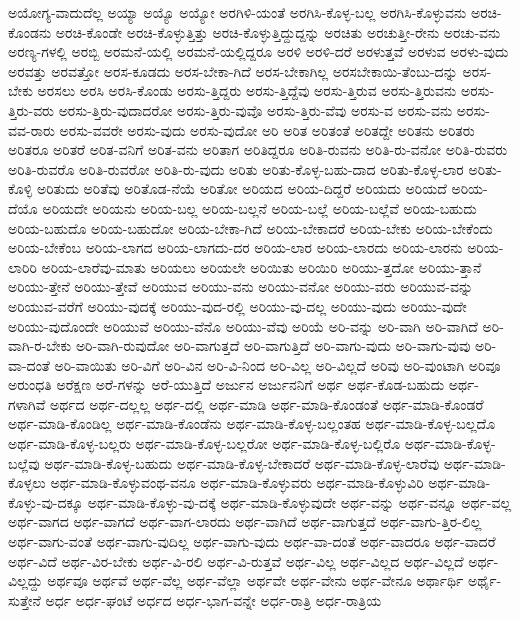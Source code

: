 {ಅಯೋಗ್ಯ-ವಾದುದೆಲ್ಲ
ಅಯ್ಯಾ
ಅಯ್ಯೊ
ಅಯ್ಯೋ
ಅರಗಿಳಿ-ಯಂತೆ
ಅರಗಿಸಿ-ಕೊಳ್ಳ-ಬಲ್ಲ
ಅರಗಿಸಿ-ಕೊಳ್ಳುವನು
ಅರಚಿ-ಕೊಂಡನು
ಅರಚಿ-ಕೊಂಡೇ
ಅರಚಿ-ಕೊಳ್ಳುತ್ತಿತ್ತು
ಅರಚಿ-ಕೊಳ್ಳುತ್ತಿದ್ದುದ್ದನ್ನು
ಅರಚಿತು
ಅರಚುತ್ತೀ-ರೇನು
ಅರಚು-ವನು
ಅರಣ್ಯ-ಗಳಲ್ಲಿ
ಅರಬ್ಬಿ
ಅರಮನೆ-ಯಲ್ಲಿ
ಅರಮನೆ-ಯಲ್ಲಿದ್ದರೂ
ಅರಳಿ
ಅರಳಿ-ದರೆ
ಅರಳುತ್ತವೆ
ಅರಳುವ
ಅರಳು-ವುದು
ಅರವತ್ತು
ಅರವತ್ತೋ
ಅರಸ-ಕೂಡದು
ಅರಸ-ಬೇಕಾ-ಗಿದೆ
ಅರಸ-ಬೇಕಾಗಿಲ್ಲ
ಅರಸಬೇಕಾಯಿ-ತೆಂಬು-ದನ್ನು
ಅರಸ-ಬೇಕು
ಅರಸಲು
ಅರಸಿ
ಅರಸಿ-ಕೊಂಡು
ಅರಸು-ತ್ತಿದ್ದರು
ಅರಸು-ತ್ತಿದ್ದೆವು
ಅರಸು-ತ್ತಿರುವ
ಅರಸು-ತ್ತಿರುವನು
ಅರಸು-ತ್ತಿರು-ವರು
ಅರಸು-ತ್ತಿರು-ವುದಾದರೋ
ಅರಸು-ತ್ತಿರು-ವುವೊ
ಅರಸು-ತ್ತಿರು-ವೆವು
ಅರಸು-ವ
ಅರಸು-ವನು
ಅರಸು-ವವ-ರಾರು
ಅರಸು-ವವರೇ
ಅರಸು-ವುದು
ಅರಸು-ವುದೋ
ಅರಿ
ಅರಿತ
ಅರಿತಂತೆ
ಅರಿತದ್ದೇ
ಅರಿತನು
ಅರಿತರು
ಅರಿತರೂ
ಅರಿತರೆ
ಅರಿತ-ವನಿಗೆ
ಅರಿತ-ವನು
ಅರಿತಾಗ
ಅರಿತಿದ್ದರೂ
ಅರಿತಿ-ರುವನು
ಅರಿತಿ-ರು-ವನೋ
ಅರಿತಿ-ರುವರು
ಅರಿತಿ-ರುವರೊ
ಅರಿತಿ-ರುವರೋ
ಅರಿತಿ-ರು-ವುದು
ಅರಿತು
ಅರಿತು-ಕೊಳ್ಳ-ಬಹು-ದಾದ
ಅರಿತು-ಕೊಳ್ಳ-ಲಾರ
ಅರಿತು-ಕೊಳ್ಳಿ
ಅರಿತುದು
ಅರಿತೆವು
ಅರಿತೊಡ-ನೆಯೆ
ಅರಿತೋ
ಅರಿಯದ
ಅರಿಯ-ದಿದ್ದರೆ
ಅರಿಯದು
ಅರಿಯದೆ
ಅರಿಯ-ದೆಯೊ
ಅರಿಯದೇ
ಅರಿಯನು
ಅರಿಯ-ಬಲ್ಲ
ಅರಿಯ-ಬಲ್ಲನೆ
ಅರಿಯ-ಬಲ್ಲೆ
ಅರಿಯ-ಬಲ್ಲೆವೆ
ಅರಿಯ-ಬಹುದು
ಅರಿಯ-ಬಹುದೊ
ಅರಿಯ-ಬಹುದೋ
ಅರಿಯ-ಬೇಕಾ-ಗಿದೆ
ಅರಿಯ-ಬೇಕಾದರೆ
ಅರಿಯ-ಬೇಕು
ಅರಿಯ-ಬೇಕೆಂದು
ಅರಿಯ-ಬೇಕೆಂಬ
ಅರಿಯ-ಲಾಗದ
ಅರಿಯ-ಲಾಗದು-ದರ
ಅರಿಯ-ಲಾರ
ಅರಿಯ-ಲಾರದು
ಅರಿಯ-ಲಾರನು
ಅರಿಯ-ಲಾರಿರಿ
ಅರಿಯ-ಲಾರೆವು-ಮಾತು
ಅರಿಯಲು
ಅರಿಯಲೇ
ಅರಿಯಿತು
ಅರಿಯಿರಿ
ಅರಿಯು-ತ್ತದೋ
ಅರಿಯು-ತ್ತಾನೆ
ಅರಿಯು-ತ್ತೇನೆ
ಅರಿಯು-ತ್ತೇವೆ
ಅರಿಯುವ
ಅರಿಯು-ವನು
ಅರಿಯು-ವನೋ
ಅರಿಯು-ವರು
ಅರಿಯುವ-ವನ್ನು
ಅರಿಯುವ-ವರೆಗೆ
ಅರಿಯು-ವುದಕ್ಕೆ
ಅರಿಯು-ವುದ-ರಲ್ಲಿ
ಅರಿಯು-ವು-ದಲ್ಲ
ಅರಿಯು-ವುದು
ಅರಿಯು-ವುದೇ
ಅರಿಯು-ವುದೊಂದೇ
ಅರಿಯುವೆ
ಅರಿಯು-ವೆನೊ
ಅರಿಯು-ವೆವು
ಅರಿಯೆ
ಅರಿ-ವನ್ನು
ಅರಿ-ವಾಗಿ
ಅರಿ-ವಾಗಿದೆ
ಅರಿ-ವಾಗಿ-ರ-ಬೇಕು
ಅರಿ-ವಾಗಿ-ರುವುದೋ
ಅರಿ-ವಾಗುತ್ತದೆ
ಅರಿ-ವಾಗುತ್ತಿದೆ
ಅರಿ-ವಾಗು-ವುದು
ಅರಿ-ವಾಗು-ವುವು
ಅರಿ-ವಾ-ದಂತೆ
ಅರಿ-ವಾಯಿತು
ಅರಿ-ವಿಗೆ
ಅರಿ-ವಿನ
ಅರಿ-ವಿ-ನಿಂದ
ಅರಿ-ವಿಲ್ಲ
ಅರಿ-ವಿಲ್ಲದೆ
ಅರಿವು
ಅರಿ-ವುಂಟಾಗಿ
ಅರಿವೂ
ಅರುಂಧತಿ
ಅರೆಕ್ಷಣ
ಅರೆ-ಗಳನ್ನು
ಅರೆ-ಯುತ್ತಿದೆ
ಅರ್ಜುನ
ಅರ್ಜುನನಿಗೆ
ಅರ್ಥ
ಅರ್ಥ-ಕೊಡ-ಬಹುದು
ಅರ್ಥ-ಗಳಾಗಿವೆ
ಅರ್ಥದ
ಅರ್ಥ-ದಲ್ಲಲ್ಲ
ಅರ್ಥ-ದಲ್ಲಿ
ಅರ್ಥ-ಮಾಡಿ
ಅರ್ಥ-ಮಾಡಿ-ಕೊಂಡಂತೆ
ಅರ್ಥ-ಮಾಡಿ-ಕೊಂಡರೆ
ಅರ್ಥ-ಮಾಡಿ-ಕೊಂಡಿಲ್ಲ
ಅರ್ಥ-ಮಾಡಿ-ಕೊಂಡೆನು
ಅರ್ಥ-ಮಾಡಿ-ಕೊಳ್ಳ-ಬಲ್ಲಂತಹ
ಅರ್ಥ-ಮಾಡಿ-ಕೊಳ್ಳ-ಬಲ್ಲದೊ
ಅರ್ಥ-ಮಾಡಿ-ಕೊಳ್ಳ-ಬಲ್ಲರು
ಅರ್ಥ-ಮಾಡಿ-ಕೊಳ್ಳ-ಬಲ್ಲರೋ
ಅರ್ಥ-ಮಾಡಿ-ಕೊಳ್ಳ-ಬಲ್ಲಿರೊ
ಅರ್ಥ-ಮಾಡಿ-ಕೊಳ್ಳ-ಬಲ್ಲೆವು
ಅರ್ಥ-ಮಾಡಿ-ಕೊಳ್ಳ-ಬಹುದು
ಅರ್ಥ-ಮಾಡಿ-ಕೊಳ್ಳ-ಬೇಕಾದರೆ
ಅರ್ಥ-ಮಾಡಿ-ಕೊಳ್ಳ-ಲಾರೆವು
ಅರ್ಥ-ಮಾಡಿ-ಕೊಳ್ಳಲು
ಅರ್ಥ-ಮಾಡಿ-ಕೊಳ್ಳುವಂಥ-ವನೂ
ಅರ್ಥ-ಮಾಡಿ-ಕೊಳ್ಳುವರು
ಅರ್ಥ-ಮಾಡಿ-ಕೊಳ್ಳುವಿರಿ
ಅರ್ಥ-ಮಾಡಿ-ಕೊಳ್ಳು-ವು-ದಕ್ಕೂ
ಅರ್ಥ-ಮಾಡಿ-ಕೊಳ್ಳು-ವು-ದಕ್ಕೆ
ಅರ್ಥ-ಮಾಡಿ-ಕೊಳ್ಳುವುದೇ
ಅರ್ಥ-ವನ್ನು
ಅರ್ಥ-ವನ್ನೂ
ಅರ್ಥ-ವಲ್ಲ
ಅರ್ಥ-ವಾಗದ
ಅರ್ಥ-ವಾಗದೆ
ಅರ್ಥ-ವಾಗ-ಲಾರದು
ಅರ್ಥ-ವಾಗಿದೆ
ಅರ್ಥ-ವಾಗುತ್ತದೆ
ಅರ್ಥ-ವಾಗು-ತ್ತಿರ-ಲಿಲ್ಲ
ಅರ್ಥ-ವಾಗು-ವಂತೆ
ಅರ್ಥ-ವಾಗು-ವುದಿಲ್ಲ
ಅರ್ಥ-ವಾಗು-ವುದು
ಅರ್ಥ-ವಾ-ದಂತೆ
ಅರ್ಥ-ವಾದರೂ
ಅರ್ಥ-ವಾದರೆ
ಅರ್ಥ-ವಿದೆ
ಅರ್ಥ-ವಿರ-ಬೇಕು
ಅರ್ಥ-ವಿ-ರಲಿ
ಅರ್ಥ-ವಿ-ರುತ್ತವೆ
ಅರ್ಥ-ವಿಲ್ಲ
ಅರ್ಥ-ವಿಲ್ಲದ
ಅರ್ಥ-ವಿಲ್ಲದೆ
ಅರ್ಥ-ವಿಲ್ಲದ್ದು
ಅರ್ಥವೂ
ಅರ್ಥವೆ
ಅರ್ಥ-ವೆಲ್ಲ
ಅರ್ಥ-ವೆಲ್ಲಾ
ಅರ್ಥವೇ
ಅರ್ಥ-ವೇನು
ಅರ್ಥ-ವೇನೂ
ಅರ್ಥಾರ್ಥಿ
ಅರ್ಥೈ-ಸುತ್ತೇನೆ
ಅರ್ಧ
ಅರ್ಧ-ಘಂಟೆ
ಅರ್ಧದ
ಅರ್ಧ-ಭಾಗ-ವನ್ನೇ
ಅರ್ಧ-ರಾತ್ರಿ
ಅರ್ಧ-ರಾತ್ರಿಯ
}
